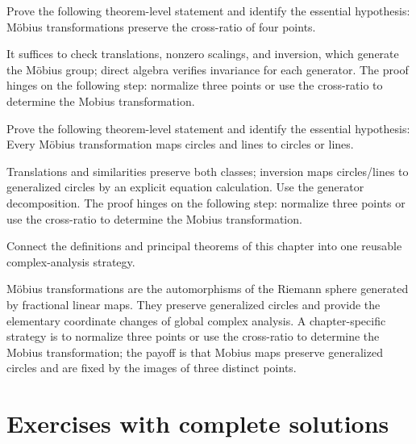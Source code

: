 \begin{problem}\label{prob:iv16-problem-10}
Prove the following theorem-level statement and identify the essential hypothesis: Möbius transformations preserve the cross-ratio of four points.
\end{problem}
\begin{solution}
It suffices to check translations, nonzero scalings, and inversion, which generate the Möbius group; direct algebra verifies invariance for each generator. The proof hinges on the following step: normalize three points or use the cross-ratio to determine the Mobius transformation.
\end{solution}

\begin{problem}\label{prob:iv16-problem-11}
Prove the following theorem-level statement and identify the essential hypothesis: Every Möbius transformation maps circles and lines to circles or lines.
\end{problem}
\begin{solution}
Translations and similarities preserve both classes; inversion maps circles/lines to generalized circles by an explicit equation calculation. Use the generator decomposition. The proof hinges on the following step: normalize three points or use the cross-ratio to determine the Mobius transformation.
\end{solution}

\begin{problem}\label{prob:iv16-problem-12}
Connect the definitions and principal theorems of this chapter into one reusable complex-analysis strategy.
\end{problem}
\begin{solution}
Möbius transformations are the automorphisms of the Riemann sphere generated by fractional linear maps. They preserve generalized circles and provide the elementary coordinate changes of global complex analysis. A chapter-specific strategy is to normalize three points or use the cross-ratio to determine the Mobius transformation; the payoff is that Mobius maps preserve generalized circles and are fixed by the images of three distinct points.
\end{solution}

\section{Exercises with complete solutions}

